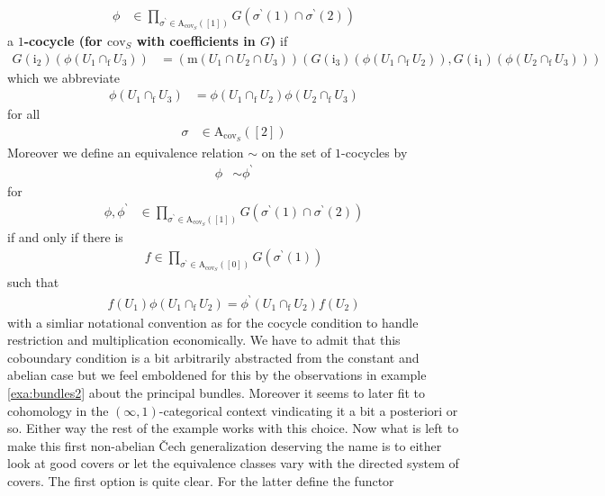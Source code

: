 \begin{exa}
\begin{align*}
  \phi
  &\in
  \prod_{\sigma^{\backprime} \in \mathrm{A}_{\mathrm{cov}_{S}}([1])}
  G(\sigma^{\backprime}(1) \cap \sigma^{\backprime}(2))
\end{align*}
a \textbf{$1$-cocycle (for $\mathrm{cov}_{S}$ with coefficients in $G$)} if
\begin{align*}
  G(\mathrm{i}_{2})
  \left(
    \phi(U_{1} \cap_{\textrm{f}} U_{3})
  \right)
  &=
  \left(
    \mathrm{m}
    \left(
      U_{1}
      \cap
      U_{2}
      \cap
      U_{3}
    \right)
  \right)
  \left(
    G(\mathrm{i}_{3})
    \left(
      \phi(U_{1} \cap_{\textrm{f}} U_{2})
    \right),
    G(\mathrm{i}_{1})
    \left(
      \phi(U_{2} \cap_{\textrm{f}} U_{3})
    \right)
  \right)
\end{align*}
which we abbreviate
\begin{align*}
  \phi(U_{1} \cap_{\textrm{f}} U_{3})
  &=
  \phi(U_{1} \cap_{\textrm{f}} U_{2})
  \phi(U_{2} \cap_{\textrm{f}} U_{3})
\end{align*}
for all
\begin{align*}
  \sigma
  &\in
  \mathrm{A}_{\mathrm{cov}_{S}}([2])
\end{align*}
Moreover we define an equivalence relation $\sim$ on the set of $1$-cocycles by
\begin{align*}
  \phi
  &\sim
  \phi^{\backprime}
\end{align*}
for
\begin{align*}
  \phi,
  \phi^{\backprime}
  &\in
  \prod_{\sigma^{\backprime} \in \mathrm{A}_{\mathrm{cov}_{S}}([1])}
  G(\sigma^{\backprime}(1) \cap \sigma^{\backprime}(2))
\end{align*}
if and only if there is
\begin{align*}
  f
  \in
  \prod_{\sigma^{\backprime} \in \mathrm{A}_{\mathrm{cov}_{S}}([0])}
  G(\sigma^{\backprime}(1))
\end{align*}
such that
\begin{align*}
  f(U_{1})
  \phi(U_{1} \cap_{\textrm{f}} U_{2})
  =
  \phi^{\backprime}(U_{1} \cap_{\textrm{f}} U_{2})
  f(U_{2})
\end{align*}
with a simliar notational convention as for the cocycle condition to handle restriction and multiplication economically. We have to admit that this coboundary condition is a bit arbitrarily abstracted from the constant and abelian case but we feel emboldened for this by the observations in example \ref{exa:bundles2} about the principal bundles. Moreover it seems to later fit to cohomology in the $(\infty,1)$-categorical context vindicating it a bit a posteriori or so. Either way the rest of the example works with this choice. Now what is left to make this first non-abelian \v{C}ech generalization deserving the name is to either look at good covers or let the equivalence classes vary with the directed system of covers. The first option is quite clear. For the latter define the functor

\end{exa}
